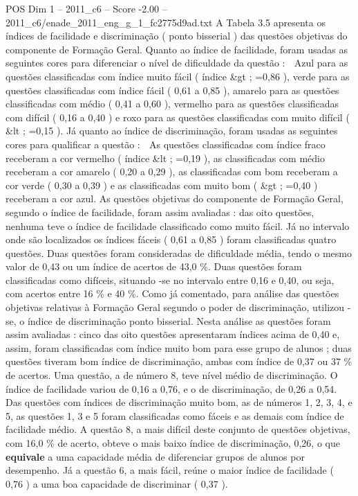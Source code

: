 \begin{textsample}{POS Dim 1 – 2011\_c6 – Score -2.00 – 2011\_c6/enade\_2011\_eng\_g\_1\_fc2775d9ad.txt}
A Tabela 3.5 apresenta os índices de facilidade e discriminação ( ponto bisserial ) das questões objetivas do componente de Formação Geral.
Quanto ao índice de facilidade, foram usadas as seguintes cores para diferenciar o nível de dificuldade da questão :  Azul para as questões classificadas com índice muito fácil ( índice \&gt ; =0,86 ), verde para as questões classificadas com índice fácil ( 0,61 a 0,85 ), amarelo para as questões classificadas com médio ( 0,41 a 0,60 ), vermelho para as questões classificadas com difícil ( 0,16 a 0,40 ) e roxo para as questões classificadas com muito difícil ( \&lt ; =0,15 ).
Já quanto ao índice de discriminação, foram usadas as seguintes cores para qualificar a questão :  As questões classificadas com índice fraco receberam a cor vermelho ( índice \&lt ; =0,19 ), as classificadas com médio receberam a cor amarelo ( 0,20 a 0,29 ), as classificadas com bom receberam a cor verde ( 0,30 a 0,39 ) e as classificadas com muito bom ( \&gt ; =0,40 ) receberam a cor azul.
As questões objetivas do componente de Formação Geral, segundo o índice de facilidade, foram assim avaliadas : das oito questões, nenhuma teve o índice de facilidade classificado como muito fácil.
Já no intervalo onde são localizados os índices fáceis ( 0,61 a 0,85 ) foram classificadas quatro questões.
Duas questões foram consideradas de dificuldade média, tendo o mesmo valor de 0,43 ou um índice de acertos de 43,0 \%.
Duas questões foram classificadas como difíceis, situando -se no intervalo entre 0,16 e 0,40, ou seja, com acertos entre 16 \% e 40 \%.
Como já comentado, para análise das questões objetivas relativas à Formação Geral segundo o poder de discriminação, utilizou -se, o índice de discriminação ponto bisserial.
Nesta análise as questões foram assim avaliadas : cinco das oito questões apresentaram índices acima de 0,40 e, assim, foram classificadas com índice muito bom para esse grupo de alunos ; duas questões tiveram bom índice de discriminação, ambas com índice de 0,37 ou 37 \% de acertos.
Uma questão, a de número 8, teve nível médio de discriminação.
O índice de facilidade variou de 0,16 a 0,76, e o de discriminação, de 0,26 a 0,54.
Das questões com índices de discriminação muito bom, as de números 1, 2, 3, 4, e 5, as questões 1, 3 e 5 foram classificadas como fáceis e as demais com índice de facilidade médio.
A questão 8, a mais difícil deste conjunto de questões objetivas, com 16,0 \% de acerto, obteve o mais baixo índice de discriminação, 0,26, o que \textbf{equivale} a uma capacidade média de diferenciar grupos de alunos por desempenho.
Já a questão 6, a mais fácil, reúne o maior índice de facilidade ( 0,76 ) a uma boa capacidade de discriminar ( 0,37 ).

\end{textsample}
